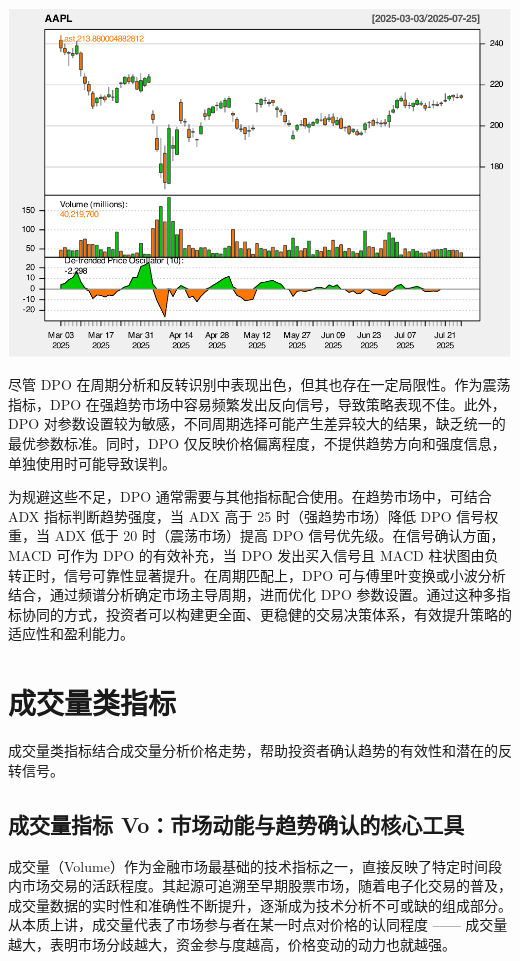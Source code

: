 \documentclass[]{ctexbook}
\begin{document}
\includegraphics[width=0.9\linewidth]{QuantmodHandbook_files/figure-latex/dpo-2}

尽管 DPO 在周期分析和反转识别中表现出色，但其也存在一定局限性。作为震荡指标，DPO 在强趋势市场中容易频繁发出反向信号，导致策略表现不佳。此外，DPO 对参数设置较为敏感，不同周期选择可能产生差异较大的结果，缺乏统一的最优参数标准。同时，DPO 仅反映价格偏离程度，不提供趋势方向和强度信息，单独使用时可能导致误判。

为规避这些不足，DPO 通常需要与其他指标配合使用。在趋势市场中，可结合 ADX 指标判断趋势强度，当 ADX 高于 25 时（强趋势市场）降低 DPO 信号权重，当 ADX 低于 20 时（震荡市场）提高 DPO 信号优先级。在信号确认方面，MACD 可作为 DPO 的有效补充，当 DPO 发出买入信号且 MACD 柱状图由负转正时，信号可靠性显著提升。在周期匹配上，DPO 可与傅里叶变换或小波分析结合，通过频谱分析确定市场主导周期，进而优化 DPO 参数设置。通过这种多指标协同的方式，投资者可以构建更全面、更稳健的交易决策体系，有效提升策略的适应性和盈利能力。

\section{成交量类指标}\label{ux6210ux4ea4ux91cfux7c7bux6307ux6807}

成交量类指标结合成交量分析价格走势，帮助投资者确认趋势的有效性和潜在的反转信号。

\subsection{成交量指标 Vo：市场动能与趋势确认的核心工具}\label{ux6210ux4ea4ux91cfux6307ux6807-voux5e02ux573aux52a8ux80fdux4e0eux8d8bux52bfux786eux8ba4ux7684ux6838ux5fc3ux5de5ux5177}

成交量（Volume）作为金融市场最基础的技术指标之一，直接反映了特定时间段内市场交易的活跃程度。其起源可追溯至早期股票市场，随着电子化交易的普及，成交量数据的实时性和准确性不断提升，逐渐成为技术分析不可或缺的组成部分。从本质上讲，成交量代表了市场参与者在某一时点对价格的认同程度 ------ 成交量越大，表明市场分歧越大，资金参与度越高，价格变动的动力也就越强。
\end{document}
